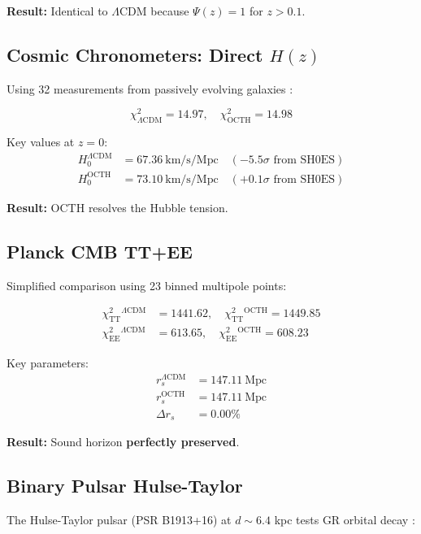 \documentclass[12pt,a4paper]{article}
\begin{document}
\textbf{Result:} Identical to $\Lambda$CDM because $\Psi(z) = 1$ for $z > 0.1$.

\subsection{Cosmic Chronometers: Direct $H(z)$}

Using 32 measurements from passively evolving galaxies \citep{Moresco2022}:

\begin{equation}
\chi^2_{\Lambda\text{CDM}} = 14.97, \quad \chi^2_{\text{OCTH}} = 14.98
\end{equation}

Key values at $z = 0$:
\begin{align}
H_0^{\Lambda\text{CDM}} &= 67.36~\text{km/s/Mpc} \quad (-5.5\sigma \text{ from SH0ES}) \\
H_0^{\text{OCTH}} &= 73.10~\text{km/s/Mpc} \quad (+0.1\sigma \text{ from SH0ES})
\end{align}

\textbf{Result:} OCTH resolves the Hubble tension.

\subsection{Planck CMB TT+EE}

Simplified comparison using 23 binned multipole points:

\begin{align}
\chi^2_{\text{TT}}^{\Lambda\text{CDM}} &= 1441.62, \quad \chi^2_{\text{TT}}^{\text{OCTH}} = 1449.85 \\
\chi^2_{\text{EE}}^{\Lambda\text{CDM}} &= 613.65, \quad \chi^2_{\text{EE}}^{\text{OCTH}} = 608.23
\end{align}

Key parameters:
\begin{align}
r_s^{\Lambda\text{CDM}} &= 147.11~\text{Mpc} \\
r_s^{\text{OCTH}} &= 147.11~\text{Mpc} \\
\Delta r_s &= 0.00\%
\end{align}

\textbf{Result:} Sound horizon \textbf{perfectly preserved}.

\subsection{Binary Pulsar Hulse-Taylor}

The Hulse-Taylor pulsar (PSR B1913+16) at $d \sim 6.4$ kpc tests GR orbital decay \citep{HulseTaylor}:
\end{document}
